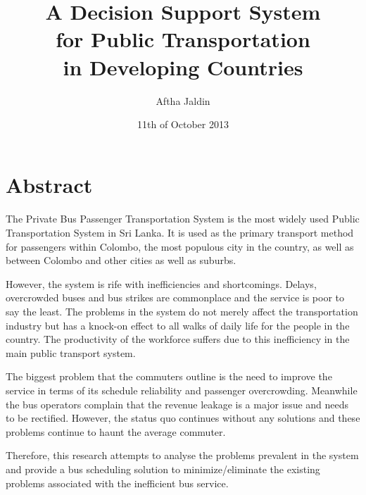 \documentclass[12pt, oneside]{report}
\title{
A Decision Support System
\\ for Public Transportation
\\ in Developing Countries
}
\author{Aftha Jaldin}
\date{11th of October 2013}
\begin{document}
\maketitle

\tableofcontents
\newpage
{}

\listoffigures
\newpage

\listoftables
\newpage


\section*{Abstract}

\paragraph{ } The Private Bus Passenger Transportation System is the most widely used Public Transportation System in Sri Lanka. It is used as the primary transport method for passengers within Colombo, the most populous city in the country, as well as between Colombo and other cities as well as suburbs.

However, the system is rife with inefficiencies and shortcomings. Delays, overcrowded buses and bus strikes are commonplace and the service is poor to say the least. The problems in the system do not merely affect the transportation industry but has a knock-on effect to all walks of daily life for the people in the country. The productivity of the workforce suffers due to this inefficiency in the main public transport system.

The biggest problem that the commuters outline is the need to improve the service in terms of its schedule reliability and passenger overcrowding. Meanwhile the bus operators complain that the revenue leakage is a major issue and needs to be rectified. However, the status quo continues without any solutions and these problems continue to haunt the average commuter.

Therefore, this research attempts to analyse the problems prevalent in the system and provide a bus scheduling solution to minimize/eliminate the existing problems associated with the inefficient bus service.

\newpage

\end{document}
